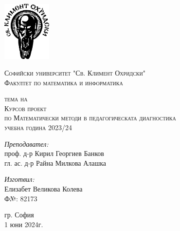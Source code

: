 \newcommand{\univname}{Софийски университет "Св. Климент Охридски"\\Факултет по математика и информатика}

\begin{titlepage}
    \begin{center}
    \vspace*{-2.3cm}
    \includegraphics[height=3cm]{resources/su_logo.png}
        
    \vspace*{.06\textheight}
    {\scshape\large \univname\par}\vspace{2.5cm}
    
    {\huge \bfseries{\thetitle}\par}\vspace{0.7cm}
    \textsc{\small тема на}\\[0.6cm]
    \textsc{\Large Курсов проект}\\[0.5cm]\vspace{0.5cm}
    \textsc{\large по Математически методи в педагогическата диагностика}\\[0.5cm]\vspace{0.5cm}
    \textsc{\normalsize учебна година 2023/24}\\[0.6cm]\vspace{1.2cm}
    
        
    \begin{minipage}[t]{0.4\textwidth}
        \begin{flushleft} \large
        \emph{Преподавател:}\\[0.7cm]
        проф. д-р Кирил Георгиев Банков\\
        гл. ас. д-р Райна Милкова Алашка\\[1.6cm]
        
        \end{flushleft}
    \end{minipage}
    \begin{minipage}[t]{0.4\textwidth}
        \begin{flushright} \large
        \emph{Изготвил:}\\[0.7cm]
        Елизабет Великова Колева\\[0.5cm]
        Ф№: 82173\\[0.5cm]
        \end{flushright}
    \end{minipage}

    \vspace{1cm}
    {\large 
    гр. София\\[0.5cm]
    1 юни 2024г.
    }
    
    \end{center}
\end{titlepage}